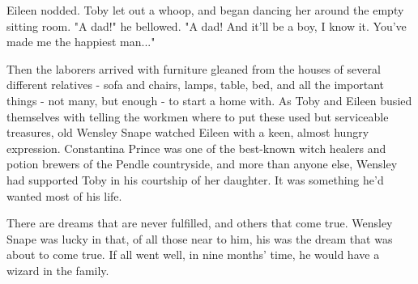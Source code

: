 \documentclass[a4paper,11pt]{article}
\begin{document}
Eileen nodded. Toby let out a whoop, and began dancing her around the empty sitting room. "A dad!" he bellowed. "A dad! And it'll be a boy, I know it. You've made me the happiest man..."

Then the laborers arrived with furniture gleaned from the houses of several different relatives - sofa and chairs, lamps, table, bed, and all the important things - not many, but enough - to start a home with. As Toby and Eileen busied themselves with telling the workmen where to put these used but serviceable treasures, old Wensley Snape watched Eileen with a keen, almost hungry expression. Constantina Prince was one of the best-known witch healers and potion brewers of the Pendle countryside, and more than anyone else, Wensley had supported Toby in his courtship of her daughter. It was something he'd wanted most of his life.

There are dreams that are never fulfilled, and others that come true. Wensley Snape was lucky in that, of all those near to him, his was the dream that was about to come true. If all went well, in nine months' time, he would have a wizard in the family.
\end{document}
